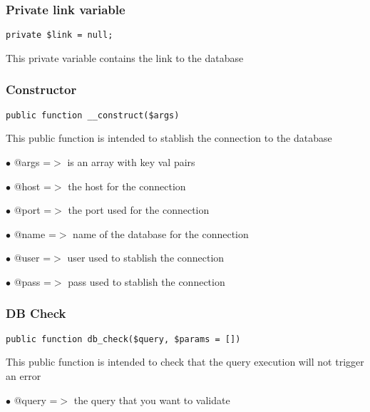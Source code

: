 \documentclass[a4paper]{article}
\begin{document}
\hypertarget{toc328}{}
\subsubsection{Private link variable}

\begin{lstlisting}
private $link = null;
\end{lstlisting}

This private variable contains the link to the database

\hypertarget{toc329}{}
\subsubsection{Constructor}

\begin{lstlisting}
public function __construct($args)
\end{lstlisting}

This public function is intended to stablish the connection to the database

\begin{compactitem}
\item[\color{myblue}$\bullet$] @args =$>$ is an array with key val pairs
\item[\color{myblue}$\bullet$] @host =$>$ the host for the connection
\item[\color{myblue}$\bullet$] @port =$>$ the port used for the connection
\item[\color{myblue}$\bullet$] @name =$>$ name of the database for the connection
\item[\color{myblue}$\bullet$] @user =$>$ user used to stablish the connection
\item[\color{myblue}$\bullet$] @pass =$>$ pass used to stablish the connection
\end{compactitem}

\hypertarget{toc330}{}
\subsubsection{DB Check}

\begin{lstlisting}
public function db_check($query, $params = [])
\end{lstlisting}

This public function is intended to check that the query execution will not trigger an error

\begin{compactitem}
\item[\color{myblue}$\bullet$] @query =$>$ the query that you want to validate
\end{compactitem}
\end{document}
